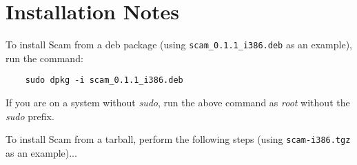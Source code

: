 \documentclass{article}
\begin{document}
%
%


\section*{Installation Notes}

To install Scam from a deb package
(using {\tt scam\_0.1.1\_i386.deb} as an example), run the command:

\begin{verbatim}
    sudo dpkg -i scam_0.1.1_i386.deb
\end{verbatim}

If you are on a system without {\it sudo}, run the above command
as {\it root} without the {\it sudo} prefix.

To install Scam from a tarball, perform the following steps
(using {\tt scam-i386.tgz} as an example)...
\end{document}

